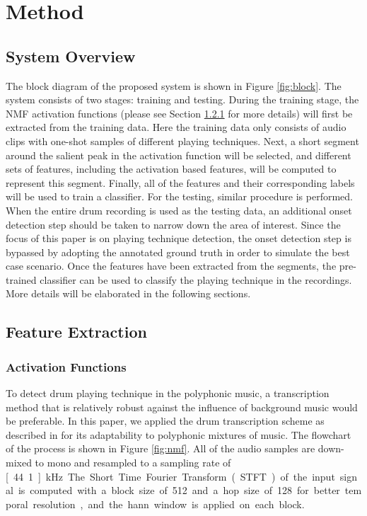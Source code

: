 \documentclass{article}
\begin{document}
\section{Method}\label{sec:method}
\subsection{System Overview}\label{ssec:overview}

The block diagram of the proposed system is shown in Figure \ref{fig:block}. The system consists of two stages: training and testing. During the training stage, the NMF activation functions (please see Section \ref{sssec:activ} for more details) will first be extracted from the training data. Here the training data only consists of audio clips with one-shot samples of different playing techniques. Next, a short segment around the salient peak in the activation function will be selected, and different sets of features, including the activation based features, will be computed to represent this segment. Finally, all of the features and their corresponding labels will be used to train a classifier. For the testing, similar procedure is performed. When the entire drum recording is used as the testing data, an additional onset detection step should be taken to narrow down the area of interest. Since the focus of this paper is on playing technique detection, the onset detection step is bypassed by adopting the annotated ground truth in order to simulate the best case scenario. Once the features have been extracted from the segments, the pre-trained classifier can be used to classify the playing technique in the recordings. More details will be elaborated in the following sections. 
 
\subsection{Feature Extraction}\label{ssec:featuresExtract}
\subsubsection{Activation Functions}
\label{sssec:activ}

To detect drum playing technique in the polyphonic music, a transcription method that is relatively robust against the influence of background music would be preferable. In this paper, we applied the drum transcription scheme as described in \cite{Wu2015a} for its adaptability to polyphonic mixtures of music. The flowchart of the process is shown in Figure \ref{fig:nmf}. All of the audio samples are down-mixed to mono and resampled to a sampling rate of \unit[44.1]{kHz}. The Short Time Fourier Transform (STFT) of the input signal is computed with a block size of 512 and a hop size of 128 for better temporal resolution, and the hann window is applied on each block. 
\end{document}
